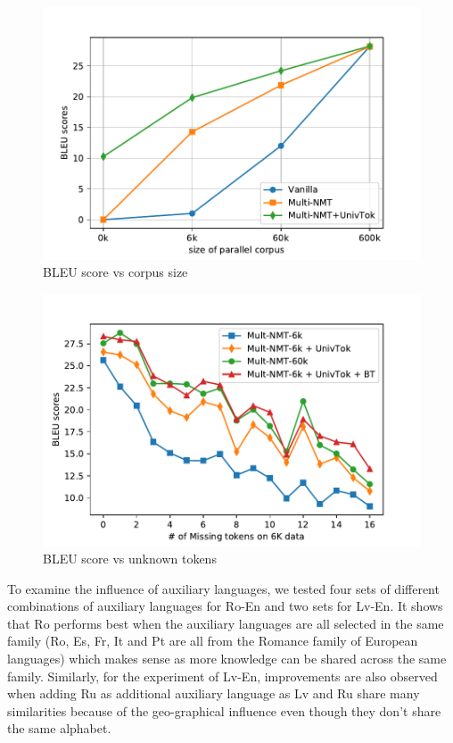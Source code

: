  \begin{figure}[hptb]
	\centering
    \includegraphics[width=0.85\linewidth]{figs/ulr/size} 
    \caption{\label{cp5.fig.size}BLEU score vs corpus size}
    \end{figure}
    \begin{figure}[hptb]
    \centering
    \includegraphics[width=0.85\linewidth]{figs/ulr/missing} 
    \caption{\label{cp5.fig.missing}BLEU score vs unknown tokens}
\end{figure}

To examine the influence  of auxiliary languages, we tested four sets of different combinations of auxiliary languages for Ro-En and two sets for Lv-En. It shows that Ro performs best when the auxiliary languages are all selected in the same family (Ro, Es, Fr, It and Pt are all from the Romance family of European languages) which makes sense as more knowledge can be shared across the same family. Similarly, for the experiment of Lv-En, improvements are also observed when adding Ru as additional auxiliary language as Lv and Ru share many similarities because of the geo-graphical influence even though they don't share the same alphabet. 

